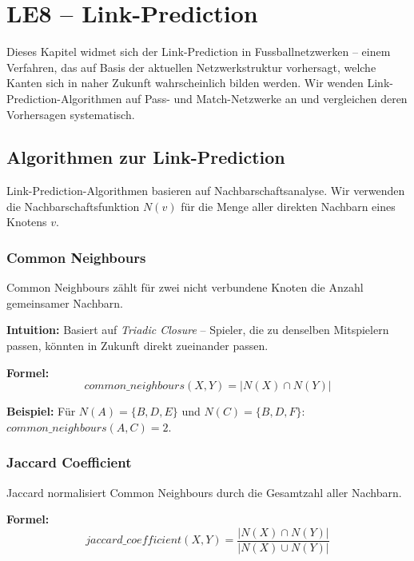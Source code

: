 \section{LE8 -- Link-Prediction}

Dieses Kapitel widmet sich der Link-Prediction in Fussballnetzwerken -- einem Verfahren, das auf Basis der aktuellen Netzwerkstruktur vorhersagt, welche Kanten sich in naher Zukunft wahrscheinlich bilden werden. Wir wenden Link-Prediction-Algorithmen auf Pass- und Match-Netzwerke an und vergleichen deren Vorhersagen systematisch.

\subsection{Algorithmen zur Link-Prediction}

Link-Prediction-Algorithmen basieren auf Nachbarschaftsanalyse. Wir verwenden die Nachbarschaftsfunktion $N(v)$ für die Menge aller direkten Nachbarn eines Knotens $v$.

\subsubsection{Common Neighbours}

Common Neighbours zählt für zwei nicht verbundene Knoten die Anzahl gemeinsamer Nachbarn.

\textbf{Intuition:} Basiert auf \textit{Triadic Closure} -- Spieler, die zu denselben Mitspielern passen, könnten in Zukunft direkt zueinander passen.

\textbf{Formel:}
\begin{equation}
common\_neighbours(X, Y) = |N(X) \cap N(Y)|
\label{eq:cn}
\end{equation}

\textbf{Beispiel:} Für $N(A) = \{B, D, E\}$ und $N(C) = \{B, D, F\}$: $common\_neighbours(A, C) = 2$.

\subsubsection{Jaccard Coefficient}

Jaccard normalisiert Common Neighbours durch die Gesamtzahl aller Nachbarn.

\textbf{Formel:}
\begin{equation}
jaccard\_coefficient(X, Y) = \frac{|N(X) \cap N(Y)|}{|N(X) \cup N(Y)|}
\label{eq:jaccard}
\end{equation}

